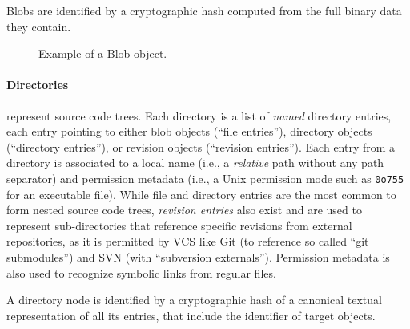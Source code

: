 Blobs are identified by a cryptographic hash computed from the full binary data
they contain.


\begin{figure}%
    \centering
{}
\caption{Example of a Blob object.}
\end{figure}



\begin{figure}\centering
{}
\end{figure}
\paragraph{\textbf{Directories}} represent source code trees. Each directory is
a list of \emph{named} directory entries, each entry pointing to either blob
objects (``file entries''), directory objects (``directory entries''), or
revision objects (``revision entries''). Each entry from a directory is
associated to a local name (i.e., a \emph{relative} path without any path
separator) and permission metadata (i.e., a Unix permission mode such as
\texttt{0o755} for an executable file). While file and directory entries are
the most common to form nested source code trees, \emph{revision entries} also
exist and are used to represent sub-directories that reference specific
revisions from external repositories, as it is permitted by VCS like Git (to
reference so called ``git submodules'') and SVN (with ``subversion
externals''). Permission metadata is also used to recognize symbolic links from
regular files.

A directory node is identified by a cryptographic hash of a canonical textual
representation of all its entries, that include the identifier of target
objects.

